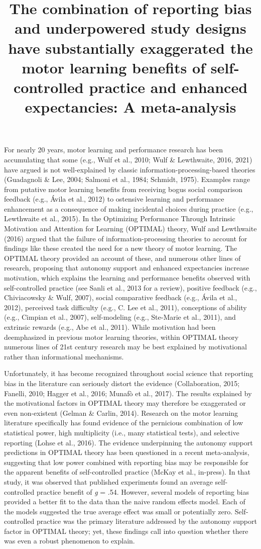 \documentclass[
  doc, donotrepeattitle,floatsintext]{apa7}
\title{The combination of reporting bias and underpowered study designs have substantially exaggerated the motor learning benefits of self-controlled practice and enhanced expectancies: A meta-analysis}
\author{\phantom{0}}
\date{}
\affiliation{\phantom{0}}
\begin{document}
\maketitle

For nearly 20 years, motor learning and performance research has been accumulating that some (e.g., Wulf et al., 2010; Wulf \& Lewthwaite, 2016, 2021) have argued is not well-explained by classic information-processing-based theories (Guadagnoli \& Lee, 2004; Salmoni et al., 1984; Schmidt, 1975). Examples range from putative motor learning benefits from receiving bogus social comparison feedback (e.g., Ávila et al., 2012) to ostensive learning and performance enhancement as a consequence of making incidental choices during practice (e.g., Lewthwaite et al., 2015). In the Optimizing Performance Through Intrinsic Motivation and Attention for Learning (OPTIMAL) theory, Wulf and Lewthwaite (2016) argued that the failure of information-processing theories to account for findings like these created the need for a new theory of motor learning. The OPTIMAL theory provided an account of these, and numerous other lines of research, proposing that autonomy support and enhanced expectancies increase motivation, which explains the learning and performance benefits observed with self-controlled practice (see Sanli et al., 2013 for a review), positive feedback (e.g., Chiviacowsky \& Wulf, 2007), social comparative feedback (e.g., Ávila et al., 2012), perceived task difficulty (e.g., C. Lee et al., 2011), conceptions of ability (e.g., Cimpian et al., 2007), self-modeling (e.g., Ste-Marie et al., 2011), and extrinsic rewards (e.g., Abe et al., 2011). While motivation had been deemphasized in previous motor learning theories, within OPTIMAL theory numerous lines of 21st century research may be best explained by motivational rather than informational mechanisms.

Unfortunately, it has become recognized throughout social science that reporting bias in the literature can seriously distort the evidence (Collaboration, 2015; Fanelli, 2010; Hagger et al., 2016; Munafò et al., 2017). The results explained by the motivational factors in OPTIMAL theory may therefore be exaggerated or even non-existent (Gelman \& Carlin, 2014). Research on the motor learning literature specifically has found evidence of the pernicious combination of low statistical power, high multiplicity (i.e., many statistical tests), and selective reporting (Lohse et al., 2016). The evidence underpinning the autonomy support predictions in OPTIMAL theory has been questioned in a recent meta-analysis, suggesting that low power combined with reporting bias may be responsible for the apparent benefits of self-controlled practice (McKay et al., in-press). In that study, it was observed that published experiments found an average self-controlled practice benefit of \emph{g} = .54. However, several models of reporting bias provided a better fit to the data than the naive random effects model. Each of the models suggested the true average effect was small or potentially zero. Self-controlled practice was the primary literature addressed by the autonomy support factor in OPTIMAL theory; yet, these findings call into question whether there was even a robust phenomenon to explain.
\end{document}
